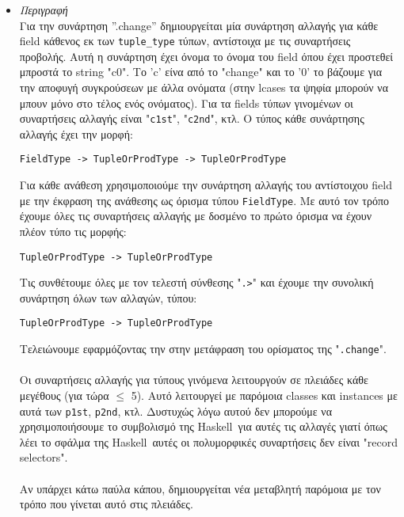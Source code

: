 \documentclass[diploma]{softlab-thesis}
\def\H{Haskell}
\begin{document}
\begin{itemize}
\begin{itemize}
\item
\textit{Περιγραφή}\\

Για την συνάρτηση ”.change” δημιουργείται μία συνάρτηση αλλαγής για κάθε field
κάθενος εκ των \verb|tuple_type| τύπων, αντίστοιχα με τις συναρτήσεις προβολής.
Αυτή η συνάρτηση έχει όνομα το όνομα του field όπου έχει προστεθεί μπροστά το
string "c0". Το 'c' είνα από το "change" και το '0' το βάζουμε για την αποφυγή
συγκρούσεων με άλλα ονόματα (στην lcases τα ψηφία μπορούν να μπουν μόνο στο
τέλος ενός ονόματος). Για τα fields τύπων γινομένων οι συναρτήσεις αλλαγής
είναι "\texttt{c1st}", "\texttt{c2nd}", κτλ. Ο τύπος κάθε συνάρτησης αλλαγής
έχει την μορφή:
\begin{verbatim}
FieldType -> TupleOrProdType -> TupleOrProdType
\end{verbatim}

Για κάθε ανάθεση χρησιμοποιούμε την συνάρτηση αλλαγής του αντίστοιχου field
με την έκφραση της ανάθεσης ως όρισμα τύπου \texttt{FieldType}.
Με αυτό τον τρόπο έχουμε όλες τις συναρτήσεις αλλαγής με δοσμένο το πρώτο
όρισμα να έχουν πλέον τύπο τις μορφής:
\begin{verbatim}
TupleOrProdType -> TupleOrProdType
\end{verbatim}

Τις συνθέτουμε όλες με τον τελεστή σύνθεσης "\texttt{.>}" και έχουμε την
συνολική συνάρτηση όλων των αλλαγών, τύπου:
\begin{verbatim}
TupleOrProdType -> TupleOrProdType
\end{verbatim}

Τελειώνουμε εφαρμόζοντας την στην μετάφραση του ορίσματος της "\texttt{.change}".
\\\\
Οι συναρτήσεις αλλαγής για τύπους γινόμενα λειτουργούν σε πλειάδες κάθε
μεγέθους (για τώρα $\leq$ 5). Αυτό λειτουργεί με παρόμοια classes και
instances με αυτά των \texttt{p1st}, \texttt{p2nd}, κτλ. Δυστυχώς λόγω αυτού
δεν μπορούμε να χρησιμοποιήσουμε το συμβολισμό της \H\ για αυτές τις αλλαγές
γιατί όπως λέει το σφάλμα της \H\ αυτές οι πολυμορφικές συναρτήσεις
δεν είναι "record selectors".
\\\\
Αν υπάρχει κάτω παύλα κάπου, δημιουργείται νέα μεταβλητή παρόμοια με τον τρόπο
που γίνεται αυτό στις πλειάδες.

\end{itemize}

\end{itemize}
\end{document}
